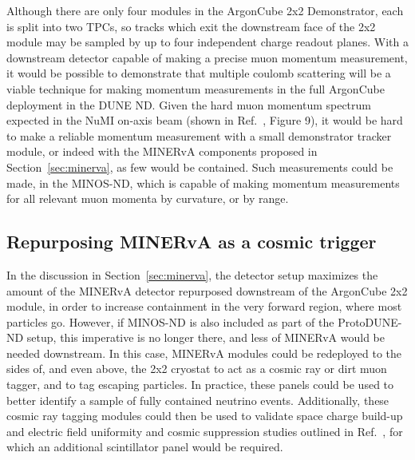 Although there are only four modules in the ArgonCube 2x2 Demonstrator, each is split into two TPCs, so tracks which exit the downstream face of the 2x2 module may be sampled by up to four independent charge readout planes. With a downstream detector capable of making a precise muon momentum measurement, it would be possible to demonstrate that multiple coulomb scattering will be a viable technique for making momentum measurements in the full ArgonCube deployment in the DUNE ND. Given the hard muon momentum spectrum expected in the NuMI on-axis beam (shown in Ref.~\cite{2x2@FNAL}, Figure 9), it would be hard to make a reliable momentum measurement with a small demonstrator tracker module, or indeed with the MINERvA components proposed in Section~\ref{sec:minerva}, as few would be contained. Such measurements could be made, in the MINOS-ND, which is capable of making momentum measurements for all relevant muon momenta by curvature, or by range.

\subsection{Repurposing MINERvA as a cosmic trigger}
In the discussion in Section~\ref{sec:minerva}, the detector setup maximizes the amount of the MINERvA detector repurposed downstream of the ArgonCube 2x2 module, in order to increase containment in the very forward region, where most particles go. However, if MINOS-ND is also included as part of the ProtoDUNE-ND setup, this imperative is no longer there, and less of MINERvA would be needed downstream. In this case, MINERvA modules could be redeployed to the sides of, and even above, the 2x2 cryostat to act as a cosmic ray or dirt muon tagger, and to tag escaping particles. In practice, these panels could be used to better identify a sample of fully contained neutrino events. Additionally, these cosmic ray tagging modules could then be used to validate space charge build-up and electric field uniformity and cosmic suppression studies outlined in Ref.~\cite{2x2@FNAL}, for which an additional scintillator panel would be required.

